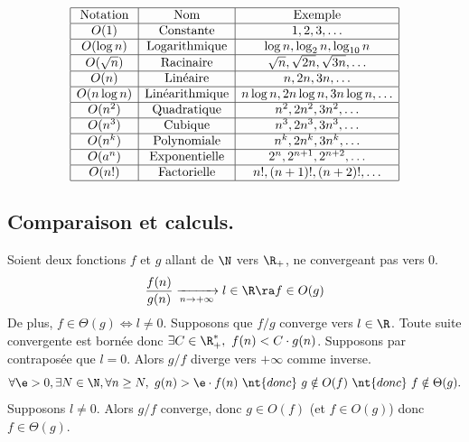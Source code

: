\documentclass[french, 11pt]{article}
\begin{document}
\begin{defi}{}{}
    \begin{equation*}
        \begin{array}{|c|c|c|}
            \hline
            \text{Notation} & \text{Nom} & \text{Exemple} \\
            \hline
            O(1) & \text{Constante} & 1, 2, 3, \ldots \\
            \hline
            O(\log n) & \text{Logarithmique} & \log n, \log_2 n, \log_{10} n \\
            \hline
            O(\sqrt{n}) & \text{Racinaire} & \sqrt{n}, \sqrt{2n}, \sqrt{3n}, \ldots \\
            \hline
            O(n) & \text{Linéaire} & n, 2n, 3n, \ldots \\
            \hline
            O(n\log n) & \text{Linéarithmique} & n\log n, 2n\log n, 3n\log n, \ldots \\
            \hline
            O(n^2) & \text{Quadratique} & n^2, 2n^2, 3n^2, \ldots \\
            \hline
            O(n^3) & \text{Cubique} & n^3, 2n^3, 3n^3, \ldots \\
            \hline
            O(n^k) & \text{Polynomiale} & n^k, 2n^k, 3n^k, \ldots \\
            \hline
            O(a^n) & \text{Exponentielle} & 2^n, 2^{n+1}, 2^{n+2}, \ldots \\
            \hline
            O(n!) & \text{Factorielle} & n!, (n+1)!, (n+2)!, \ldots \\
            \hline
        \end{array}
    \end{equation*}
\end{defi}

\subsection{Comparaison et calculs.}

\begin{defi}{}{}
    Soient deux fonctions $f$ et $g$ allant de $\N$ vers $\R_+$, ne convergeant pas vers 0.
    \begin{equation*}
        \frac{f(n)}{g(n)}\xrightarrow[n\to+\infty]{}l \in \R \ra f \in O(g)
    \end{equation*}
    De plus, $f\in\Theta(g) \iff l \neq 0$.
    \tcblower
    Supposons que $f/g$ converge vers $l\in\R$. Toute suite convergente est bornée donc $\exists C\in\R_+^*, ~ f(n)<C\cdot g(n)$.\n
    \boxed{\ra} Supposons par contraposée que $l=0$.  Alors $g/f$ diverge vers $+\infty$ comme inverse.
    \begin{equation*}
        \forall \e>0, \exists N\in\N, \forall n \geq N, ~ g(n)>\e \cdot f(n) ~\nt{donc}~ g\notin O(f) ~\nt{donc}~ f\notin\Theta(g).
    \end{equation*}
    \boxed{\la} Supposons $l\neq0$. Alors $g/f$ converge, donc $g\in O(f)$ (et $f\in O(g)$) donc $f\in\Theta(g)$.
\end{defi}
\end{document}
